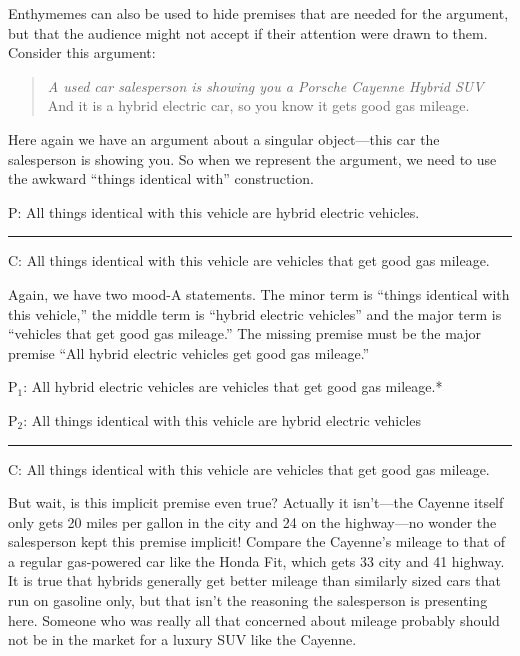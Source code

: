 Enthymemes can also be used to hide premises that are needed for the argument, but that the audience might not accept if their attention were drawn to them. Consider this argument:

\begin{quotation}\noindent \textit{A used car salesperson is showing you a Porsche Cayenne Hybrid SUV} And it is a hybrid electric car, so you know it gets good gas mileage. \end{quotation}

Here again we have an argument about a singular object---this car the salesperson is showing you. So when we represent the argument, we need to use the awkward ``things identical with'' construction.

\begin{earg}
\item[P:] All things identical with this vehicle are hybrid electric vehicles.
\vspace{-.5em}
\item [] \rule{0.7\linewidth}{.5pt} 
\item[C:] All things identical with this vehicle are vehicles that get good gas mileage.
\end{earg} 

Again, we have two mood-A statements. The minor term is ``things identical with this vehicle,'' the middle term is ``hybrid electric vehicles'' and the major term is ``vehicles that get good gas mileage.'' The missing premise must be the major premise ``All hybrid electric vehicles get good gas mileage.'' 

\begin{earg}
\item[P$_1$:] All hybrid electric vehicles are vehicles that get good gas mileage.*
\item[P$_2$:] All things identical with this vehicle are hybrid electric vehicles
\vspace{-.5em}
\item [] \rule{0.7\linewidth}{.5pt} 
\item[C:] All things identical with this vehicle are vehicles that get good gas mileage.
\end{earg} 

But wait, is this implicit premise even true? Actually it isn't---the Cayenne itself only gets 20 miles per gallon in the city and 24 on the highway---no wonder the salesperson kept this premise implicit! Compare the Cayenne's mileage to that of a regular gas-powered car like the Honda Fit, which gets 33 city and 41 highway. It is true that hybrids generally get better mileage than similarly sized cars that run on gasoline only, but that isn't the reasoning the salesperson is presenting here. Someone who was really all that concerned about mileage probably should not be in the market for a luxury SUV like the Cayenne.  

